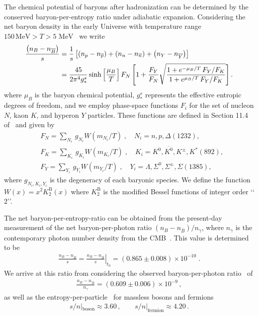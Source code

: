 \documentclass[universe,article,submit,moreauthors,pdftex,a4paper]{Definitions/mdpi}
\newcommand{\MeV}{\text{ MeV}}
\begin{document}
The chemical potential of baryons after hadronization can be determined by the conserved baryon-per-entropy ratio under adiabatic expansion. Considering the net baryon density in the early Universe with temperature range $150\,\mathrm{MeV}>T>5\MeV$~\cite{Yang:2021bko} we write
\begin{align}\label{Baryon_ChemicalPotential}
\frac{\left(n_B-n_{\overline{B}}\right)}{s}&=\frac{1}{s}\left[\left(n_p-n_{\overline{p}}\right)+\left(n_n-n_{\overline{n}}\right)+\left(n_Y-n_{\overline{Y}}\right)\right]\notag\\
&=\frac{45}{2\pi^4g^s_\ast}\sinh\left[\frac{\mu_B}{T}\right]F_N\left[1+\frac{F_Y}{F_N}\sqrt{\frac{1+e^{-\mu_B/T}\,F_Y/F_K}{1+e^{\mu_B/T}\,F_Y/F_K}}\right].
\end{align}
where $\mu_{B}$ is the baryon chemical potential, $g_{*}^{s}$ represents the effective entropic degrees of freedom, and we employ phase-space functions $F_i$ for the set of nucleon $N$, kaon $K$, and hyperon $Y$ particles. These functions are defined in Section 11.4 of~\cite{Letessier:2002ony} and given by
\begin{align}
&F_N=\sum_{N_i}\,g_{N_i}W(m_{N_i}/T)\;, \quad N_i=n, p, \Delta(1232),\\
&F_K=\sum_{K_i}\,g_{K_i}W(m_{K_i}/T)\;, \quad K_i=K^0, \overline{K^0}, K^\pm, K^\ast(892),\\
&F_Y=\sum_{Y_i}\,g_{Y_i}W(m_{Y_i}/T)\;, \quad Y_i=\Lambda, \Sigma^0,\Sigma^\pm, \Sigma(1385),
\end{align}
where $g_{N_i,K_i,Y_i}$ is the degeneracy of each baryonic species. We define the function $W(x)=x^2K^\mathrm{B}_2(x)$ where $K^\mathrm{B}_2$ is the modified Bessel functions of integer order \lq\lq$2$\rq\rq. 

The net baryon-per-entropy-ratio can be obtained from the present-day measurement of the net baryon-per-photon ratio $\left(n_{B}-n_{\overline{B}}\right)/n_{\gamma}$, where $n_{\gamma}$ is the contemporary photon number density from the CMB~\cite{Yang:2021bko}. This value is determined to be
\begin{align}\label{BdS}
\frac{n_B-n_{\overline{B}}}{s}= \left.\frac{n_B-n_{\overline{B}}}{s}\right|_{t_0}=(0.865\pm0.008)\times10^{-10} \;.
\end{align}
We arrive at this ratio from considering the observed baryon-per-photon ratio~\cite{ParticleDataGroup:2018ovx} of
\begin{align}
 \frac{n_B-n_{\overline{B}}}{n_\gamma}= (0.609\pm0.006)\times10^{-9}\,, 
\end{align}
as well as the entropy-per-particle~\cite{Fromerth:2012fe} for massless bosons and fermions 
\begin{align}
s/n|_\mathrm{boson}\approx 3.60\,,\qquad
s/n|_\mathrm{fermion}\approx 4.20\,.
\end{align}
\end{document}
